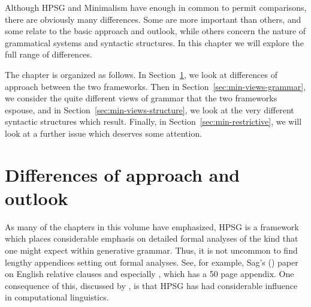 \documentclass[output=paper]{langsci/langscibook}
\begin{document}
Although HPSG and Minimalism have enough in common to permit comparisons, there are obviously many differences. Some are more important than others, and some relate to the basic approach and outlook, while others concern the nature of grammatical systems and syntactic structures. In this chapter we will explore the full range of differences.

The chapter is organized as follows. In Section~\ref{sec:min-difference}, we look at differences of approach between the two frameworks. Then in Section~\ref{sec:min-views-grammar}, we consider the quite different views of grammar that the two frameworks espouse, and in Section~\ref{sec:min-views-structure}, we look at the very different syntactic structures which result. Finally, in Section~\ref{sec:min-restrictive}, we will look at a further issue which deserves some attention.

\section{Differences of approach and outlook}
\label{sec:min-difference}
As many of the chapters in this volume have emphasized, HPSG is a framework which places considerable emphasis on detailed formal analyses of the kind that one might expect within generative grammar. Thus, it is not uncommon to find lengthy appendices setting out formal analyses. See, for example, Sag's (\citeyear{Sag97a}) paper on English relative clauses and especially \citet{GSag2000a-u}, which has a 50 page appendix. One consequence of this, discussed by , is that HPSG has had considerable influence in computational linguistics.
\end{document}
